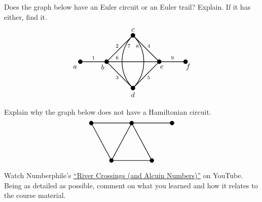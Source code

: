 \documentclass[11pt,letterpaper]{article}
\begin{document}
 Does the graph below have an Euler circuit or an Euler trail? Explain. If it has either, find it. 
	\[
	\begin{tikzpicture}[scale=1.3]
	\draw[line width=0.03cm] (0,0) -- (4,0);
	\draw[line width=0.03cm] (1,0) -- (2,1) -- (3,0) -- (2,-1) -- (1,0);
	\draw[line width=0.03cm] (2,-1) to[out= 45,in= -45] (2,1);
	\draw[line width=0.03cm] (2,-1) to[out= 135,in= -135] (2,1);
	
	\draw[fill=black] (0,0) circle (0.08); 
	\draw[fill=black] (1,0) circle (0.08); 
	\draw[fill=black] (2,1) circle (0.08); 
	\draw[fill=black] (2,-1) circle (0.08); 
	\draw[fill=black] (3,0) circle (0.08); 
	\draw[fill=black] (4,0) circle (0.08); 
	
	\node at (-0.2,-0.2) {$a$};
	\node at (0.85,-0.2) {$b$};
	\node at (2,1.2) {$c$};
	\node at (2,-1.25) {$d$};
	\node at (3.1,-0.2) {$e$};
	\node at (4.1,-0.2) {$f$};
	
	\node at (0.5,0.15) {\scriptsize$1$};
	\node at (1.4,0.6) {\scriptsize$2$};
	\node at (1.4,-0.6) {\scriptsize$3$};
	\node at (2.6,0.6) {\scriptsize$4$};
	\node at (2.6,-0.6) {\scriptsize$5$};
	\node at (1.4,0.15) {\scriptsize$6$};
	\node at (1.85,0.6) {\scriptsize$7$};
	\node at (2.17,0.59) {\scriptsize$8$};
	\node at (3.5,0.15) {\scriptsize$9$};
	\end{tikzpicture}
	\]



\newpage



 Explain why the graph below does not have a Hamiltonian circuit. 
	\[
	\begin{tikzpicture}
	\draw[line width=0.03cm] (0,0) -- (-1,1.86) -- (1,1.86) -- (0,0) -- (2,0) -- (1,1.86) -- (3,1.86);
	
	\draw[fill=black] (0,0) circle (0.1); 
	\draw[fill=black] (-1,1.86) circle (0.1); 
	\draw[fill=black] (1,1.86) circle (0.1); 
	\draw[fill=black] (2,0) circle (0.1); 
	\draw[fill=black] (3,1.86) circle (0.1); 
	\end{tikzpicture}
	\]



\newpage



 Watch Numberphile's \href{https://www.youtube.com/watch?v=ZCVAGb1ee8A&pp=ygUkUml2ZXIgQ3Jvc3NpbmdzIChhbmQgQWxjdWluIE51bWJlcnMp}{``River Crossings (and Alcuin Numbers)''} on YouTube. Being as detailed as possible, comment on what you learned and how it relates to the course material. 
\end{document}
